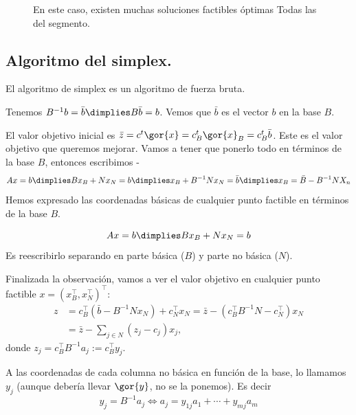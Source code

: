 \begin{figure}[h!]
\centering
{}
\caption{En este caso, existen muchas soluciones factibles óptimas Todas las del segmento.}
\end{figure}



\begin{theorem}


\end{theorem}

\subsection{Algoritmo del simplex.}


El algoritmo de simplex es un algoritmo de fuerza bruta.

Tenemos $B^{-1}b = \bar{b} \dimplies B\bar{b} = b$. Vemos que $\bar{b}$ es el vector $b$ en la base $B$.

El valor objetivo inicial es $\bar{z} = c^t\gor{x} = c^t_B\gor{x}_B = c^t_B\bar{b}$. Este es el valor objetivo que queremos mejorar. Vamos a tener que ponerlo todo en términos de la base $B$, entonces escribimos
-
\[Ax = b \dimplies Bx_B + Nx_N = b \dimplies x_B + B^{-1}Nx_N = \bar{b}\dimplies x_B = \bar{B} - B^{-1}NX_n \]
Hemos expresado las coordenadas básicas de cualquier punto factible en términos de la base $B$.

\obs \[Ax = b \dimplies Bx_B + Nx_N = b \] Es reescribirlo separando en parte básica ($B$) y parte no básica ($N$).


Finalizada la observación, vamos a ver el valor objetivo en cualquier punto factible $x=(x_B^\top,x_N^\top)^\top$:
\begin{align*}
z &= c_B^\top (\bar{b}-B^{-1} N x_N)+c^\top_N x_N =
 \bar{z}-(c_B^\top B^{-1} N - c_N^\top)x_N\\
  &=\bar{z}- \sum_{j\in N} (z_j-c_j)x_j,
\end{align*}
donde $z_j = c_B^\top B^{-1} a_j:= c_B^\top y_j$.

A las coordenadas de cada columna no básica en función de la base, lo llamamos $y_j$ (aunque debería llevar $\gor{y}$, no se la ponemos). Es decir
\[y_j=B^{-1} a_j\Leftrightarrow a_j = y_{1j} a_1+\cdots + y_{mj}a_m\]


